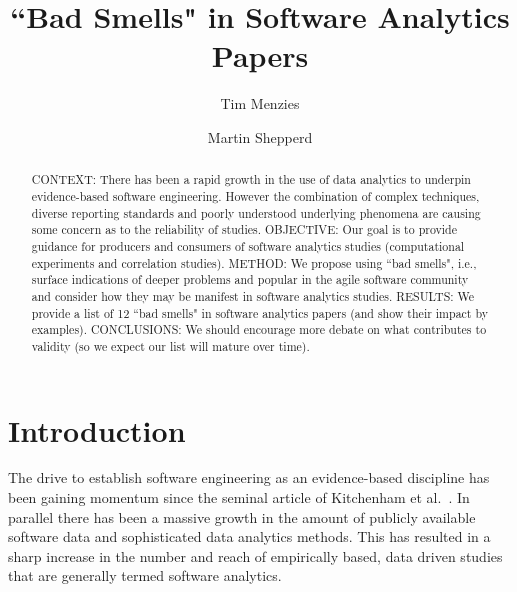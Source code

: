 \documentclass[10pt]{elsarticle}
\newcommand{\RED}{\color{black}}
\newcommand{\BLACK}{\color{black}}
\begin{document}

\title{``Bad Smells" in Software Analytics Papers}
\author{Tim Menzies}
\address{Dept.\ of Computer Science\\North Carolina State University, USA}
\author{Martin Shepperd}
\address{Brunel Software Engineering Lab (BSEL)\\Dept.\ of Computer Science\\Brunel University London\\ UB8 3PH, UK}


\begin{abstract}
CONTEXT:  There has been a rapid growth in the use of data analytics to underpin evidence-based software engineering.  However the combination of complex techniques, diverse reporting standards and poorly understood underlying phenomena are causing some concern as to the reliability of studies.\newline
OBJECTIVE: Our goal is to provide guidance for producers and consumers of software analytics studies (computational experiments and correlation studies).\newline
METHOD: We propose using ``bad smells", i.e., surface indications of deeper problems and popular in the agile software community and consider how they may be manifest in software analytics studies.\newline
RESULTS: We provide a list of 12 ``bad smells" in software analytics papers (and show their impact by examples).\newline 
CONCLUSIONS: We should encourage more debate on what  \RED contributes to validity \BLACK  (so we expect our list will mature over time).
\end{abstract}


\maketitle

\section{Introduction}


\noindent
The drive to establish software engineering as an evidence-based discipline has been gaining momentum since the seminal article of Kitchenham et al.~\cite{Kitc04}.  In parallel there has been a massive growth in the amount of publicly available software data and sophisticated data analytics methods.  This has resulted in a sharp increase in the number and reach of empirically based, data driven studies that are generally termed software analytics.
\end{document}
